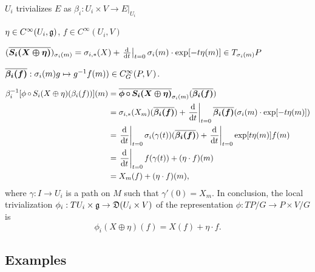 \begin{example}[Local trivialization of representation of $TP/G$ on $E = P \times V/G$]\label{localTrivializationOfRepresentationOfAtiyahTPGonAssociated}
\label{exampleLocalTrivializationOfGroupInducedRepresentationOfAtiyahLieAlgebroidAction}
$U_i$ trivializes $E$ as $\beta_i: U_i \times V\to E|_{U_i}$

$\eta \in C^\infty(U_i, \mathfrak{g})$, $f \in C^\infty(U_i, V)$

$(\upsect{S_i(X \oplus \eta)})_{\sigma_i(m)} = \sigma_{i, *}(X) + \der{t}[t=0]{\sigma_i(m) \cdot \exp[-t \eta(m)]} \in T_{\sigma_i(m)} P$


$\overline{\bm{\beta_i(f)}}: \sigma_i(m)g \mapsto g^{-1} f(m)) \in C^\infty_G(P, V)$.


\begin{align*}
    \beta_i^{-1}[\phi\comp S_i(X \oplus \eta)(\beta_i(f))] (m)
        &= \upsect{\phi \comp S_i(X \oplus \eta)}_{\sigma_i(m)} (\upsect{\beta_i(f)})\\
        &= \sigma_{i, *}(X_m)(\upsect{\beta_i(f)}) 
        + \der{t}[t = 0]{\upsect{\beta_i(f)}(\sigma_i(m) \cdot \exp[-t \eta(m)])}\\
        &= \der{t}[t = 0]{\sigma_i(\gamma(t))} (\upsect{\beta_i(f)}) + \der{t}[t=0]{\exp[t \eta(m)] f(m)}\\
        &= \der{t}[t=0]{f(\gamma(t))} + (\eta \cdot f)(m)\\
        &= X_m(f) + (\eta \cdot f)(m),
\end{align*}
where $\gamma: I \to U_i$ is a path on $M$ such that $\gamma'(0) = X_m$. In conclusion, the local trivialization $\phi_i: TU_i \times \alg g \to \alg D(U_i \times V)$ of the representation $\phi: TP/G \to P \times V/G$ is
\begin{equation}\label{equationLocalRepresentationAtiyahLieAlgebroidOnAssociatedVectorBundleExpectedTrivialALgebroidRepresentationActionOfGroup}
    \phi_i(X \oplus \eta)(f) = X(f) + \eta \cdot f.
\end{equation}
\end{example}




\subsection{Examples}


